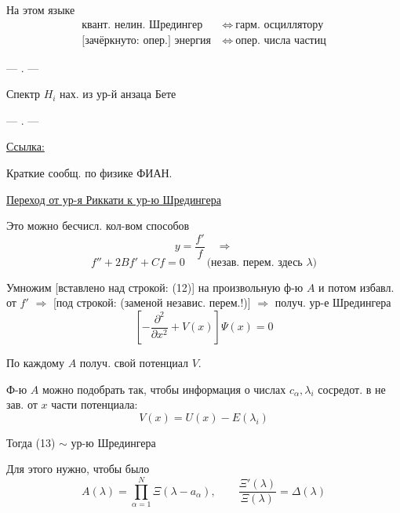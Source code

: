 На этом языке
\begin{equation*}
\begin{aligned}
\text{квант. нелин. Шредингер}&\ \Longleftrightarrow\ \text{гарм. осциллятору}\\
\text{[зачёркнуто: опер.] энергия}&\ \Longleftrightarrow\ \text{опер. числа частиц}
\end{aligned}
\end{equation*}

\begin{center}— . —\end{center}

Спектр $H_i$ нах. из ур-й анзаца Бете

\begin{center}— . —\end{center}

\underline{Ссылка:}

Краткие сообщ. по физике ФИАН.

\underline{Переход от ур-я Риккати к ур-ю Шредингера}

Это можно бесчисл. кол-вом способов
\begin{equation*}
y=\frac{f'}{f}\quad\Longrightarrow
\end{equation*}
\begin{equation*}
f''+2Bf'+Cf=0
\qquad\text{(незав. перем. здесь $\lambda$)}
\tag{12}
\end{equation*}

Умножим [вставлено над строкой: (12)] на произвольную ф-ю $A$ и потом избавл. от $f'$
$\Longrightarrow$ [под строкой: (заменой независ. перем.!)]
$\Longrightarrow$ получ. ур-е Шредингера
\begin{equation*}
\left[-\frac{\partial^2}{\partial x^2}+V(x)\right]\Psi(x)=0
\tag{13}
\end{equation*}

По каждому $A$ получ. свой потенциал $V$.

Ф-ю $A$ можно подобрать так, чтобы информация о числах
$c_\alpha,\lambda_i$ сосредот. в не зав. от $x$ части потенциала:
\begin{equation*}
V(x)=U(x)-E(\lambda_i)
\tag{14}
\end{equation*}

Тогда (13) 
$\sim$ ур-ю Шредингера

Для этого нужно, чтобы было
\begin{equation*}
A(\lambda)=\prod_{\alpha=1}^{N}\Xi(\lambda-a_\alpha),
\qquad\frac{\Xi'(\lambda)}{\Xi(\lambda)}=\Delta(\lambda)
\tag{15}
\end{equation*}

